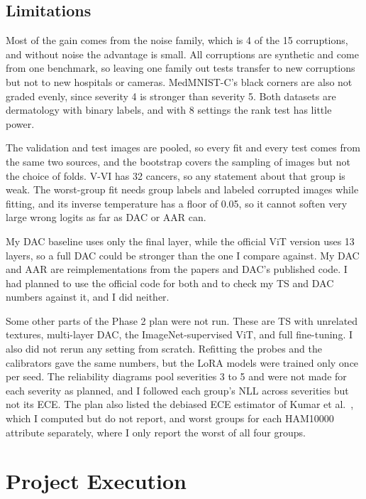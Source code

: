 \documentclass[sigconf,nonacm]{acmart}
\begin{document}
\subsection{Limitations}

Most of the gain comes from the noise family, which is 4 of the 15 corruptions, and without noise the advantage is small. All corruptions are synthetic and come from one benchmark, so leaving one family out tests transfer to new corruptions but not to new hospitals or cameras. MedMNIST-C's black corners are also not graded evenly, since severity 4 is stronger than severity 5. Both datasets are dermatology with binary labels, and with 8 settings the rank test has little power.

The validation and test images are pooled, so every fit and every test comes from the same two sources, and the bootstrap covers the sampling of images but not the choice of folds. V-VI has 32 cancers, so any statement about that group is weak. The worst-group fit needs group labels and labeled corrupted images while fitting, and its inverse temperature has a floor of 0.05, so it cannot soften very large wrong logits as far as DAC or AAR can.

My DAC baseline uses only the final layer, while the official ViT version uses 13 layers, so a full DAC could be stronger than the one I compare against. My DAC and AAR are reimplementations from the papers and DAC's published code. I had planned to use the official code for both and to check my TS and DAC numbers against it, and I did neither.

Some other parts of the Phase 2 plan were not run. These are TS with unrelated textures, multi-layer DAC, the ImageNet-supervised ViT, and full fine-tuning. I also did not rerun any setting from scratch. Refitting the probes and the calibrators gave the same numbers, but the LoRA models were trained only once per seed. The reliability diagrams pool severities 3 to 5 and were not made for each severity as planned, and I followed each group's NLL across severities but not its ECE. The plan also listed the debiased ECE estimator of Kumar et al.\ \cite{kumar2019verified}, which I computed but do not report, and worst groups for each HAM10000 attribute separately, where I only report the worst of all four groups.

\section{Project Execution}
\label{sec:plan}
\end{document}
